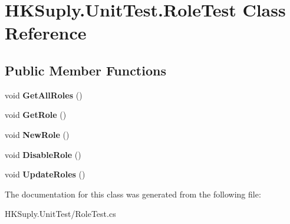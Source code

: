 \hypertarget{class_h_k_suply_1_1_unit_test_1_1_role_test}{}\section{H\+K\+Suply.\+Unit\+Test.\+Role\+Test Class Reference}
\label{class_h_k_suply_1_1_unit_test_1_1_role_test}
\subsection*{Public Member Functions}
\begin{DoxyCompactItemize}
\item 
\mbox{\label{class_h_k_suply_1_1_unit_test_1_1_role_test_aa9d71210dc474e284fe04b9bd38a122b}} 
void {\bfseries Get\+All\+Roles} ()
\item 
\mbox{\label{class_h_k_suply_1_1_unit_test_1_1_role_test_a8a280b4286b4071e13440d7c7f179e13}} 
void {\bfseries Get\+Role} ()
\item 
\mbox{\label{class_h_k_suply_1_1_unit_test_1_1_role_test_ad7e762c47c24c111dac35a0539f1325a}} 
void {\bfseries New\+Role} ()
\item 
\mbox{\label{class_h_k_suply_1_1_unit_test_1_1_role_test_ad1920b59b54f4b79a8aefb62060d6375}} 
void {\bfseries Disable\+Role} ()
\item 
\mbox{\label{class_h_k_suply_1_1_unit_test_1_1_role_test_a515e4f6d1342bc184a49a94d6d97835d}} 
void {\bfseries Update\+Roles} ()
\end{DoxyCompactItemize}


The documentation for this class was generated from the following file\+:\begin{DoxyCompactItemize}
\item 
H\+K\+Suply.\+Unit\+Test/Role\+Test.\+cs\end{DoxyCompactItemize}
